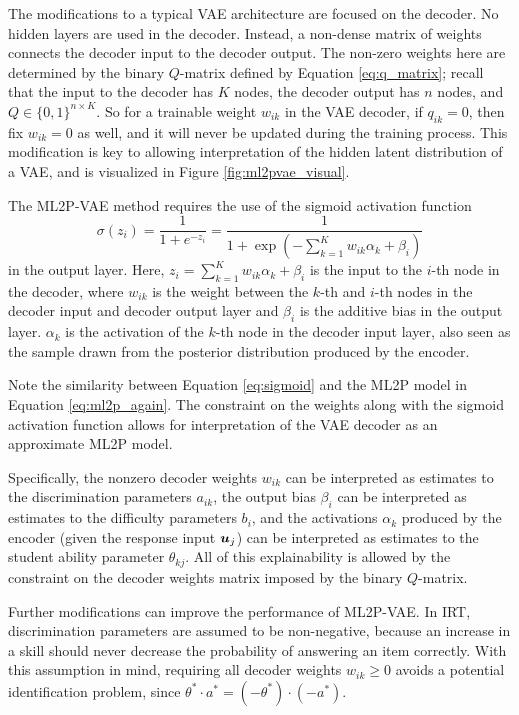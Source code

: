 The modifications to a typical VAE architecture are focused on the decoder. No hidden layers are used in the decoder. Instead, a non-dense matrix of weights connects the decoder input to the decoder output. The non-zero weights here are determined by the binary $Q$-matrix defined by Equation \ref{eq:q_matrix}; recall that the input to the decoder has $K$ nodes, the decoder output has $n$ nodes, and $Q \in \{0,1\}^{n \times K}$. So for a trainable weight $w_{ik}$ in the VAE decoder, if $q_{ik}=0$, then fix $w_{ik}=0$ as well, and it will never be updated during the training process. This modification is key to allowing interpretation of the hidden latent distribution of a VAE, and is visualized in Figure \ref{fig:ml2pvae_visual}.

The ML2P-VAE method requires the use of the sigmoid activation function
\begin{equation}
  \sigma(z_i) = \frac{1}{1 + e^{-z_i}} = \frac{1}{1 + \exp\left(- \sum_{k=1}^K w_{ik} \alpha_k + \beta_i \right)}
  \label{eq:sigmoid}
\end{equation}
in the output layer. Here, $z_i = \sum_{k=1}^K w_{ik}\alpha_{k} + \beta_i$ is the input to the $i$-th node in the decoder, where $w_{ik}$ is the weight between the $k$-th and $i$-th nodes in the decoder input and decoder output layer and $\beta_i$ is the additive bias in the output layer. $\alpha_k$ is the activation of the $k$-th node in the decoder input layer, also seen as the sample drawn from the posterior distribution produced by the encoder. 

Note the similarity between Equation \ref{eq:sigmoid} and the ML2P model in Equation \ref{eq:ml2p_again}. The constraint on the weights along with the sigmoid activation function allows for interpretation of the VAE decoder as an approximate ML2P model.

Specifically, the nonzero decoder weights $w_{ik}$ can be interpreted as estimates to the discrimination parameters $a_{ik}$, the output bias $\beta_i$ can be interpreted as estimates to the difficulty parameters $b_i$, and the activations $\alpha_k$ produced by the encoder (given the response input $\boldsymbol{u}_j$) can be interpreted as estimates to the student ability parameter $\theta_{kj}$. All of this explainability is allowed by the constraint on the decoder weights matrix imposed by the binary $Q$-matrix.

Further modifications can improve the performance of ML2P-VAE. In IRT, discrimination parameters are assumed to be non-negative, because an increase in a skill should never decrease the probability of answering an item correctly. With this assumption in mind, requiring all decoder weights $w_{ik} \geq 0$ avoids a potential identification problem, since $\theta^* \cdot a^* = (-\theta^*)\cdot(-a^*)$.

